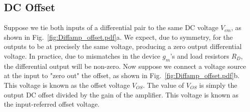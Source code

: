 \subsection{DC Offset}
Suppose we tie both inputs of a differential pair to the same DC voltage $V_{cm}$, as shown in Fig.~\ref{fig:Diffamp_offset.pdf}a.  We expect, due to symmetry, for the outputs to be at precisely the same voltage, producing a zero output differential voltage.  In practice, due to mismatches in the device $g_m$'s and load resistors $R_D$, the differential output will be non-zero.  Now suppose we connect a voltage source at the input to "zero out" the offset, as shown in Fig.~\ref{fig:Diffamp_offset.pdf}b.  This voltage is known as the offset voltage $V_{OS}$.  The value of $V_{OS}$ is simply the output DC offset divided by the gain of the amplifier.  This voltage is known as the input-referred offset voltage.
